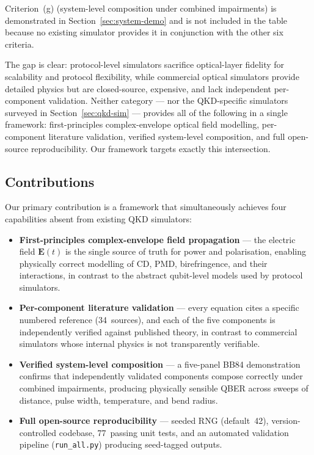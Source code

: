 \documentclass[11pt,a4paper]{article}
\begin{document}
Criterion~(g) (system-level composition under combined impairments)
is demonstrated in Section~\ref{sec:system-demo} and is not included
in the table because no existing simulator provides it in conjunction
with the other six criteria.

The gap is clear: protocol-level simulators sacrifice optical-layer
fidelity for scalability and protocol flexibility, while commercial
optical simulators provide detailed physics but are closed-source,
expensive, and lack independent per-component validation.  Neither
category --- nor the QKD-specific simulators surveyed in
Section~\ref{sec:qkd-sim} --- provides all of the following in a
single framework: first-principles complex-envelope optical field
modelling, per-component literature validation, verified system-level
composition, and full open-source reproducibility.  Our framework
targets exactly this intersection.

\subsection{Contributions}

Our primary contribution is a framework that simultaneously achieves
four capabilities absent from existing QKD simulators:

\begin{itemize}[nosep]
  \item \textbf{First-principles complex-envelope field propagation} ---
    the electric field $\mathbf{E}(t)$ is the single source of truth
    for power and polarisation, enabling physically correct modelling
    of CD, PMD, birefringence, and their interactions, in contrast to
    the abstract qubit-level models used by protocol simulators.

  \item \textbf{Per-component literature validation} --- every equation
    cites a specific numbered reference (34~sources), and each of the
    five components is independently verified against published theory,
    in contrast to commercial simulators whose internal physics is not
    transparently verifiable.

  \item \textbf{Verified system-level composition} --- a five-panel BB84
    demonstration confirms that independently validated components
    compose correctly under combined impairments, producing physically
    sensible QBER across sweeps of distance, pulse width, temperature,
    and bend radius.

  \item \textbf{Full open-source reproducibility} --- seeded RNG
    (default~42), version-controlled codebase, 77~passing unit tests,
    and an automated validation pipeline (\texttt{run\_all.py}) producing
    seed-tagged outputs.
\end{itemize}
\end{document}
